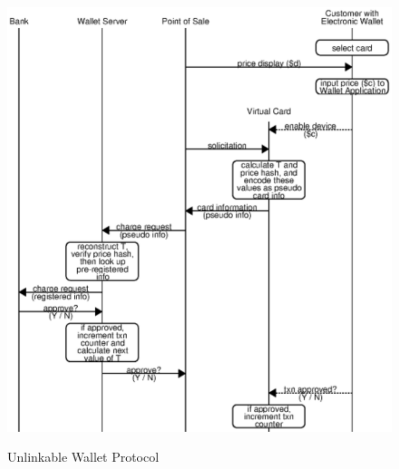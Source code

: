 \begin{figure}[h!]
  \caption{Unlinkable Wallet Protocol}
  \centering
    \includegraphics{img/unlinkable-3.eps}
  \label{fig:unlinkable-3}
\end{figure}

